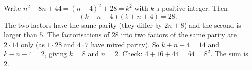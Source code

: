 Write $n^2+8n+44=(n+4)^2+28=k^2$ with $k$ a positive integer. Then
\[
(k-n-4)(k+n+4)=28 .
\]
The two factors have the same parity (they differ by $2n+8$) and the second is larger than $5$. The factorisations of $28$ into two factors of the same parity are $2\cdot14$ only (as $1\cdot28$ and $4\cdot7$ have mixed parity). So $k+n+4=14$ and $k-n-4=2$, giving $k=8$ and $n=2$. Check: $4+16+44=64=8^2$. The sum is $\boxed{2}$.
